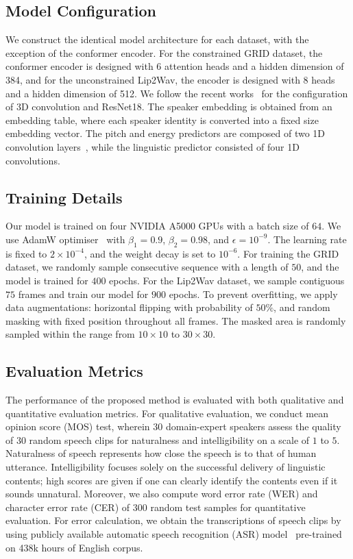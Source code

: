 \documentclass[letterpaper]{article} %
\begin{document}
\subsection{Model Configuration}
We construct the identical model architecture for each dataset, with the exception of the conformer encoder.
For the constrained GRID dataset, the conformer encoder is designed with 6 attention heads and a hidden dimension of 384, and for the unconstrained Lip2Wav, the encoder is designed with 8 heads and a hidden dimension of 512.
We follow the recent works~\cite{mira2022svts, kim2023lip} for the configuration of 3D convolution and ResNet18. The speaker embedding is obtained from an embedding table, where each speaker identity is converted into a fixed size embedding vector. The pitch and energy predictors are composed of two 1D convolution layers~\cite{lancucki2021fastpitch}, while the linguistic predictor consisted of four 1D convolutions.

\subsection{Training Details}

Our model is trained on four NVIDIA A5000 GPUs with a batch size of $64$. We use AdamW optimiser~\cite{loshchilov2017decoupled} with $\beta_1=0.9$, $\beta_2=0.98$, and $\epsilon=10^{-9}$. The learning rate is fixed to $2\times10^{-4}$, and the weight decay is set to $10^{-6}$.
For training the GRID dataset, we randomly sample consecutive sequence with a length of $50$, and the model is trained for $400$ epochs. For the Lip2Wav dataset, we sample contiguous $75$ frames and train our model for $900$ epochs.
To prevent overfitting, we apply data augmentations: horizontal flipping with probability of $50\%$, and random masking with fixed position throughout all frames. The masked area is randomly sampled within the range from $10\times10$ to $30\times30$.

\subsection{Evaluation Metrics}

The performance of the proposed method is evaluated with both qualitative and quantitative evaluation metrics.
For qualitative evaluation, we conduct mean opinion score (MOS) test, wherein $30$ domain-expert speakers assess the quality of $30$ random speech clips for naturalness and intelligibility on a scale of $1$ to $5$.
Naturalness of speech represents how close the speech is to that of human utterance.
Intelligibility focuses solely on the successful delivery of linguistic contents; high scores are given if one can clearly identify the contents even if it sounds unnatural.
Moreover, we also compute word error rate (WER) and character error rate (CER) of $300$ random test samples for quantitative evaluation.
For error calculation, we obtain the transcriptions of speech clips by using publicly available automatic speech recognition (ASR) model~\cite{radford2023robust} pre-trained on 438k hours of English corpus.
\end{document}
